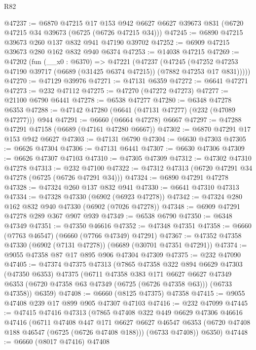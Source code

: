 \begin{lexlean}{R82}
\begin{coremodule}
@47237 := @6870
    @47215
    @17
    @153
    @942
    @6627
    @6627
    @39673
    @831
    (@6720 @47215 @34 @39673 (@6725 (@6726 @47215 @34)))
@47245 := @6890 @47215 @39673 @260 @137 @832 @941 @47190 @39702
@47252 := @6909 @47215 @39673 @280 @162 @832 @940 @6374
@47253 := @14038 @47215
@47269 := @47202
    (fun (__x0 : @6370) =>
    @47221
      (@47237
        (@47245
          (@47252 @47253 @47190 @39717 (@6689 (@31425 @6374 @47215)) (@7882 @47253 @17 @831)))))
@47270 := @47129 @39976
@47271 := @47131 @6359
@47272 := @6641 @47271
@47273 := @232 @47112
@47275 := @47270 (@47272 @47273)
@47277 := @21100 @6790 @6441
@47278 := @6538 @47277
@47280 := @6348 @47278 @6353
@47288 := @47142 @47280 (@6641 (@47131 @47277) (@232 (@47089 @47277))) @944
@47291 := @6660 (@6664 @47278) @6667
@47297 := @47288 @47291 @47158 (@6689 (@47161 @47280 @6667))
@47302 := @6870 @47291 @17 @153 @942 @6627
@47303 := @47131 @6790
@47304 := @6630 @47303
@47305 := @6626 @47304
@47306 := @47131 @6441
@47307 := @6630 @47306
@47309 := @6626 @47307 @47103
@47310 := @47305 @47309
@47312 := @47302 @47310 @47278
@47313 := @232 @47100
@47322 := @47312 @47313 (@6720 @47291 @34 @47278 (@6725 (@6726 @47291 @34)))
@47324 := @6890 @47291 @47278
@47328 := @47324 @260 @137 @832 @941
@47330 := @6641 @47310 @47313
@47334 := @47328 @47330 (@6902 (@6923 @47278))
@47342 := @47324 @280 @162 @832 @940 @47330 (@6902 (@7026 @47278))
@47348 := @6909 @47291 @47278 @289 @367 @907 @939
@47349 := @6538 @6790
@47350 := @6348 @47349
@47351 := @47350 @46616
@47352 := @47348 @47351
@47358 := @6660 (@7763 @46547) (@6660 (@7766 @47349) @47291)
@47367 := @47352 @47358 @47330 (@6902 (@7131 @47278)) (@6689 (@30701 @47351 @47291))
@47374 := @9055 @47358 @87 @17 @895 @906 @47304 @47309
@47375 := @232 @47090
@47405 := @47374
    @47375
    @47313
    (@7865
      @47358
      @322
      @894
      @6629
      @47303
      (@47350 @6353)
      @47375
      (@6711
        @47358
        @383
        @171
        @6627
        @6627
        @47349
        @6353
        (@6720 @47358 @63 @47349 (@6725 (@6726 @47358 @63)))
        (@6733 @47358))
      @6359)
@47408 := @6660 (@8125 @47375) @47358
@47415 := @9055 @47408 @239 @17 @899 @905 @47307 @47103
@47416 := @232 @47099
@47445 := @47415
    @47416
    @47313
    (@7865
      @47408
      @322
      @449
      @6629
      @47306
      @46616
      @47416
      (@6711
        @47408
        @447
        @171
        @6627
        @6627
        @46547
        @6353
        (@6720 @47408 @188 @46547 (@6725 (@6726 @47408 @188)))
        (@6733 @47408))
      @6350)
@47448 := @6660 (@8017 @47416) @47408

\end{coremodule}
\end{lexlean}
